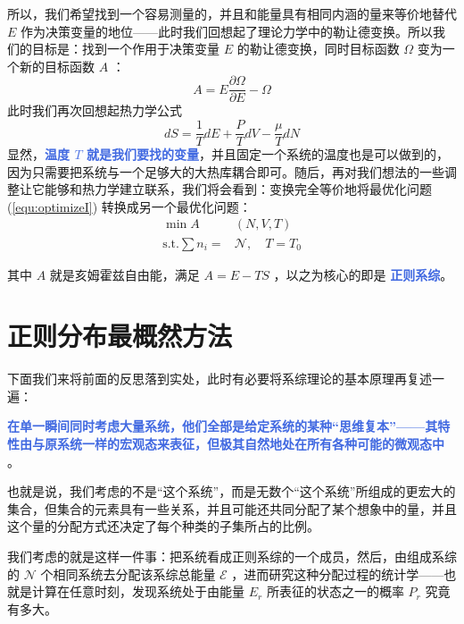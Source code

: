\documentclass[hyperref,UTF-8]{ctexbook}
\newcommand{\0}{\boldsymbol{0}}
\begin{document}
所以，我们希望找到一个容易测量的，并且和能量具有相同内涵的量来等价地替代 $E$ 作为决策变量的地位——此时我们回想起了理论力学中的勒让德变换。所以我们的目标是：找到一个作用于决策变量 $E$ 的勒让德变换，同时目标函数 $\Omega$ 变为一个新的目标函数 $A$ ：
\[
    A = E\frac{\partial \Omega}{\partial E} - \Omega
\]
此时我们再次回想起热力学公式
\[
    dS = \frac{1}{T} dE + \frac{P}{T} dV - \frac{\mu}{T} dN
\]
显然，\textcolor{RoyalBlue}{\textbf{\kaishu 温度 $T$ 就是我们要找的变量}}，并且固定一个系统的温度也是可以做到的，因为只需要把系统与一个足够大的大热库耦合即可。随后，再对我们想法的一些调整让它能够和热力学建立联系，我们将会看到：变换完全等价地将最优化问题 (\ref*{equ:optimizeI}) 转换成另一个最优化问题：
\begin{equation}\label{equ:optimizeII}
    \begin{split}
        \min A&(N,V,T)\\
        \text{s.t.}\sum n_i = &\mathcal{N},\quad T = T_0
    \end{split}
\end{equation}

其中 $A$ 就是亥姆霍兹自由能，满足 $A = E - TS$ ，以之为核心的即是 \textcolor{RoyalBlue}{\textbf{\kaishu 正则系综}}。

\section{正则分布最概然方法}\label{sec:正则分布的最概然方法}

下面我们来将前面的反思落到实处，此时有必要将系综理论的基本原理再复述一遍：

\textcolor{RoyalBlue}{\textbf{\kaishu 在单一瞬间同时考虑大量系统，他们全部是给定系统的某种“思维复本”——其特性由与原系统一样的宏观态来表征，但极其自然地处在所有各种可能的微观态中}} \cite{Pathria}。

也就是说，我们考虑的不是“这个系统”，而是无数个“这个系统”所组成的更宏大的集合，但集合的元素具有一些关系，并且可能还共同分配了某个想象中的量，并且这个量的分配方式还决定了每个种类的子集所占的比例。

我们考虑的就是这样一件事：把系统看成正则系综的一个成员，然后，由组成系综的 $\mathcal{N}$ 个相同系统去分配该系综总能量 $\mathcal{E}$ ，进而研究这种分配过程的统计学——也就是计算在任意时刻，发现系统处于由能量 $E_r$ 所表征的状态之一的概率 $P_r$ 究竟有多大。
\end{document}
